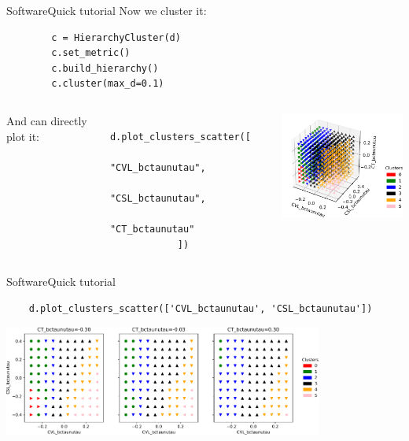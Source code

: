 \begin{frame}[fragile]{Software}{Quick tutorial}
    Now we cluster it: 
    
    \begin{verbatim}
        c = HierarchyCluster(d)
        c.set_metric()
        c.build_hierarchy()
        c.cluster(max_d=0.1)
    \end{verbatim}
    
    \begin{columns}
        And can directly plot it:
        
        \begin{changemargin}{0.32cm}{0cm}
        \begin{verbatim}
            d.plot_clusters_scatter([
                "CVL_bctaunutau",
                "CSL_bctaunutau",
                "CT_bctaunutau"   
            ])
        \end{verbatim}
        \end{changemargin}
        \centering
        \includegraphics[width=5.5cm]{figures/plots/3d.pdf}
    \end{columns}
\end{frame}


\begin{frame}[fragile, t]{Software}{Quick tutorial}
\vspace{0.75cm}
\begin{verbatim}
    d.plot_clusters_scatter(['CVL_bctaunutau', 'CSL_bctaunutau'])
\end{verbatim}
\vspace{0.2cm}
\centering
\includegraphics[width=10.5cm]{figures/plots/2dpoints.pdf}
\end{frame}

